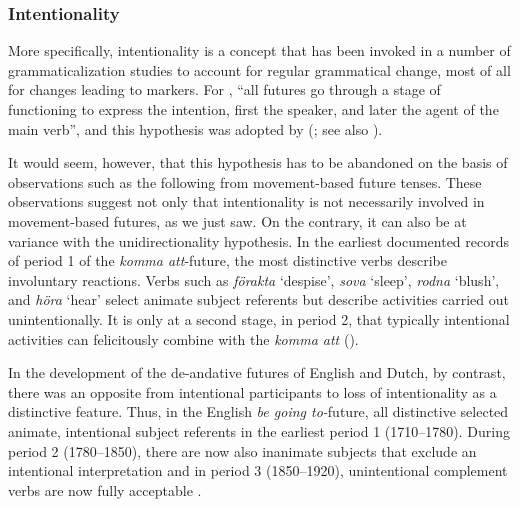 \documentclass[output=paper]{langsci/langscibook}
\begin{document}
\subsubsection{Intentionality}\label{sec:heine:4.1.4}



More specifically, intentionality is a concept that has been invoked in a number of grammaticalization studies to account for regular grammatical change, most of all for changes leading to  markers. For \citet[254]{BybeeEtAl1994}, “all futures go through a stage of functioning to express the intention, first the speaker, and later the agent of the main verb”, and this hypothesis was adopted by \citeauthor{Heine1995} (\citeyear{Heine1995}; see also \citealt{Ultan1978}).



It would seem, however, that this hypothesis has to be abandoned on the basis of observations such as the following from movement-based future tenses. These observations suggest not only that intentionality is not necessarily involved in movement-based futures, as we just saw. On the contrary, it can also be at variance with the unidirectionality hypothesis. In the earliest documented records of period 1 of the  \textit{komma att}-future, the most distinctive verbs describe involuntary reactions. Verbs such as \textit{förakta} ‘despise’, \textit{sova} ‘sleep’, \textit{rodna} ‘blush’, and \textit{höra} ‘hear’ select animate subject referents but describe activities carried out unintentionally. It is only at a second stage, in period 2, that typically intentional activities can felicitously combine with the  \textit{komma att} (\citealt[128, 131]{Hilpert2008}). 



In the development of the de-andative futures of English and Dutch, by contrast, there was an opposite  from intentional participants to loss of intentionality as a distinctive feature. Thus, in the English \textit{be going to-}future, all distinctive  selected animate, intentional subject referents in the earliest period 1 (1710--1780). During period 2 (1780--1850), there are now also inanimate subjects that exclude an intentional interpretation and in period 3 (1850--1920), unintentional complement verbs are now fully acceptable \citep[121]{Hilpert2008}.
\end{document}
